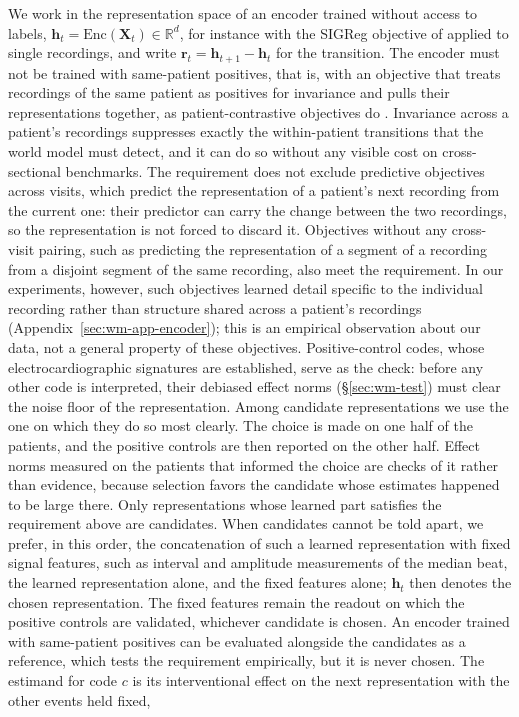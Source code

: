 We work in the representation space of an encoder trained without access to labels, $\mathbf{h}_t=\mathrm{Enc}(\mathbf{X}_t)\in\mathbb{R}^{d}$, for instance with the SIGReg objective of \citet{balestriero2025lejepa} applied to single recordings, and write $\mathbf{r}_t=\mathbf{h}_{t+1}-\mathbf{h}_t$ for the transition. The encoder must not be trained with same-patient positives, that is, with an objective that treats recordings of the same patient as positives for invariance and pulls their representations together, as patient-contrastive objectives do \citep{kiyasseh2021clocs,diamant2022pclr}. Invariance across a patient's recordings suppresses exactly the within-patient transitions that the world model must detect, and it can do so without any visible cost on cross-sectional benchmarks. The requirement does not exclude predictive objectives across visits, which predict the representation of a patient's next recording from the current one: their predictor can carry the change between the two recordings, so the representation is not forced to discard it. Objectives without any cross-visit pairing, such as predicting the representation of a segment of a recording from a disjoint segment of the same recording, also meet the requirement. In our experiments, however, such objectives learned detail specific to the individual recording rather than structure shared across a patient's recordings (Appendix~\ref{sec:wm-app-encoder}); this is an empirical observation about our data, not a general property of these objectives. Positive-control codes, whose electrocardiographic signatures are established, serve as the check: before any other code is interpreted, their debiased effect norms (\S\ref{sec:wm-test}) must clear the noise floor of the representation. Among candidate representations we use the one on which they do so most clearly. The choice is made on one half of the patients, and the positive controls are then reported on the other half. Effect norms measured on the patients that informed the choice are checks of it rather than evidence, because selection favors the candidate whose estimates happened to be large there. Only representations whose learned part satisfies the requirement above are candidates. When candidates cannot be told apart, we prefer, in this order, the concatenation of such a learned representation with fixed signal features, such as interval and amplitude measurements of the median beat, the learned representation alone, and the fixed features alone; $\mathbf{h}_t$ then denotes the chosen representation. The fixed features remain the readout on which the positive controls are validated, whichever candidate is chosen. An encoder trained with same-patient positives can be evaluated alongside the candidates as a reference, which tests the requirement empirically, but it is never chosen. The estimand for code $c$ is its interventional effect on the next representation with the other events held fixed,

